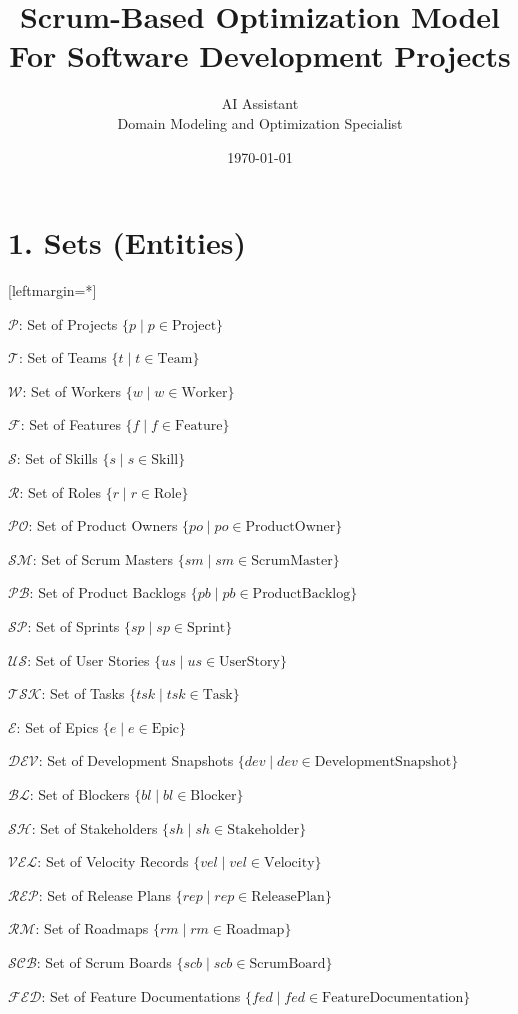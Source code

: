 \documentclass[12pt]{article}
\title{\Huge Scrum-Based Optimization Model \\ \Large For Software Development Projects}
\author{\Large AI Assistant \\ Domain Modeling and Optimization Specialist}
\date{\today}
\begin{document}
\maketitle
\tableofcontents
\newpage

\section{1. Sets (Entities)}
[leftmargin=*]
    \item $ \mathcal{P} $: Set of Projects $ \{ p \mid p \in \text{Project} \} $
    \item $ \mathcal{T} $: Set of Teams $ \{ t \mid t \in \text{Team} \} $
    \item $ \mathcal{W} $: Set of Workers $ \{ w \mid w \in \text{Worker} \} $
    \item $ \mathcal{F} $: Set of Features $ \{ f \mid f \in \text{Feature} \} $
    \item $ \mathcal{S} $: Set of Skills $ \{ s \mid s \in \text{Skill} \} $
    \item $ \mathcal{R} $: Set of Roles $ \{ r \mid r \in \text{Role} \} $
    \item $ \mathcal{PO} $: Set of Product Owners $ \{ po \mid po \in \text{ProductOwner} \} $
    \item $ \mathcal{SM} $: Set of Scrum Masters $ \{ sm \mid sm \in \text{ScrumMaster} \} $
    \item $ \mathcal{PB} $: Set of Product Backlogs $ \{ pb \mid pb \in \text{ProductBacklog} \} $
    \item $ \mathcal{SP} $: Set of Sprints $ \{ sp \mid sp \in \text{Sprint} \} $
    \item $ \mathcal{US} $: Set of User Stories $ \{ us \mid us \in \text{UserStory} \} $
    \item $ \mathcal{TSK} $: Set of Tasks $ \{ tsk \mid tsk \in \text{Task} \} $
    \item $ \mathcal{E} $: Set of Epics $ \{ e \mid e \in \text{Epic} \} $
    \item $ \mathcal{DEV} $: Set of Development Snapshots $ \{ dev \mid dev \in \text{DevelopmentSnapshot} \} $
    \item $ \mathcal{BL} $: Set of Blockers $ \{ bl \mid bl \in \text{Blocker} \} $
    \item $ \mathcal{SH} $: Set of Stakeholders $ \{ sh \mid sh \in \text{Stakeholder} \} $
    \item $ \mathcal{VEL} $: Set of Velocity Records $ \{ vel \mid vel \in \text{Velocity} \} $
    \item $ \mathcal{REP} $: Set of Release Plans $ \{ rep \mid rep \in \text{ReleasePlan} \} $
    \item $ \mathcal{RM} $: Set of Roadmaps $ \{ rm \mid rm \in \text{Roadmap} \} $
    \item $ \mathcal{SCB} $: Set of Scrum Boards $ \{ scb \mid scb \in \text{ScrumBoard} \} $
    \item $ \mathcal{FED} $: Set of Feature Documentations $ \{ fed \mid fed \in \text{FeatureDocumentation} \} $
\end{document}
